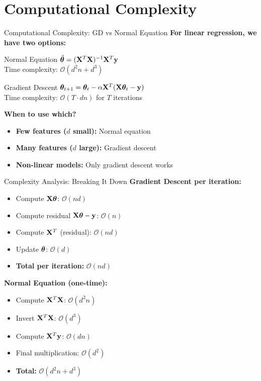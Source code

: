 \documentclass[usenames,dvipsnames]{beamer}
\begin{document}
  \section{Computational Complexity}

  \begin{frame}{Computational Complexity: GD vs Normal Equation}
    \textbf{For linear regression, we have two options:}
    
    \begin{alertbox}{Normal Equation}
    $\hat{\boldsymbol{\theta}} = (\mathbf{X}^T\mathbf{X})^{-1}\mathbf{X}^T\mathbf{y}$
    \\Time complexity: $\mathcal{O}(d^2n + d^3)$
    \end{alertbox}
    
    \begin{keypointsbox}{Gradient Descent}
    $\boldsymbol{\theta}_{t+1} = \boldsymbol{\theta}_t - \alpha \mathbf{X}^T(\mathbf{X}\boldsymbol{\theta}_t - \mathbf{y})$
    \\Time complexity: $\mathcal{O}(T \cdot dn)$ for $T$ iterations
    \end{keypointsbox}
    
    \pause
    \textbf{When to use which?}
    \begin{itemize}[<+->]
        \item \textbf{Few features ($d$ small):} Normal equation
        \item \textbf{Many features ($d$ large):} Gradient descent
        \item \textbf{Non-linear models:} Only gradient descent works
    \end{itemize}
  \end{frame}

  \begin{frame}{Complexity Analysis: Breaking It Down}
    \textbf{Gradient Descent per iteration:}
    \begin{itemize}[<+->]
        \item Compute $\mathbf{X}\boldsymbol{\theta}$: $\mathcal{O}(nd)$ 
        \item Compute residual $\mathbf{X}\boldsymbol{\theta} - \mathbf{y}$: $\mathcal{O}(n)$
        \item Compute $\mathbf{X}^T$ (residual): $\mathcal{O}(nd)$
        \item Update $\boldsymbol{\theta}$: $\mathcal{O}(d)$
        \item \textbf{Total per iteration:} $\mathcal{O}(nd)$
    \end{itemize}
    
    \pause
    \textbf{Normal Equation (one-time):}
    \begin{itemize}[<+->]
        \item Compute $\mathbf{X}^T\mathbf{X}$: $\mathcal{O}(d^2n)$
        \item Invert $\mathbf{X}^T\mathbf{X}$: $\mathcal{O}(d^3)$
        \item Compute $\mathbf{X}^T\mathbf{y}$: $\mathcal{O}(dn)$
        \item Final multiplication: $\mathcal{O}(d^2)$
        \item \textbf{Total:} $\mathcal{O}(d^2n + d^3)$
    \end{itemize}
  \end{frame}
\end{document}
